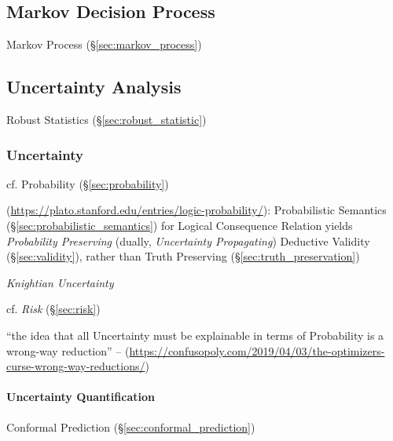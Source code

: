 \subsection{Markov Decision Process}\label{sec:markov_decision}

Markov Process (\S\ref{sec:markov_process})



\subsection{Uncertainty Analysis}\label{sec:uncertainty_analysis}

\fist Robust Statistics (\S\ref{sec:robust_statistic})



\subsubsection{Uncertainty}\label{sec:uncertainty}

cf. Probability (\S\ref{sec:probability})

(\url{https://plato.stanford.edu/entries/logic-probability/}): Probabilistic
Semantics (\S\ref{sec:probabilistic_semantics}) for Logical Consequence Relation
yields \emph{Probability Preserving} (dually, \emph{Uncertainty Propagating})
Deductive Validity (\S\ref{sec:validity}), rather than Truth Preserving
(\S\ref{sec:truth_preservation})

\emph{Knightian Uncertainty}

cf. \emph{Risk} (\S\ref{sec:risk})

``the idea that all Uncertainty must be explainable in terms of Probability is a
wrong-way reduction'' --
(\url{https://confusopoly.com/2019/04/03/the-optimizers-curse-wrong-way-reductions/})



\paragraph{Uncertainty Quantification}
\label{sec:uncertainty_quantification}\hfill

Conformal Prediction (\S\ref{sec:conformal_prediction})

